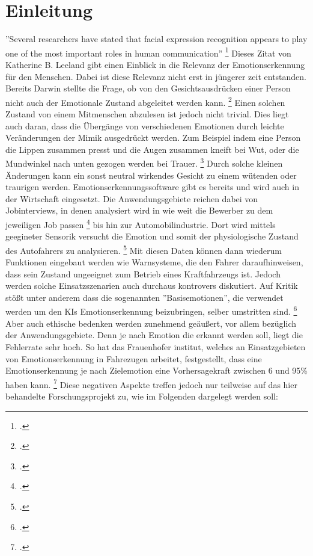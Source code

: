 \documentclass[12pt, a4paper]{scrbook}
\begin{document}
\chapter{Einleitung}
''Several researchers have stated that facial expression recognition appears to play one of the most important roles in human communication'' 
\footcite[Vgl.][1]{FaceRec}
Dieses Zitat von Katherine B. Leeland gibt einen Einblick in die Relevanz der Emotionserkennung für den Menschen. Dabei ist diese Relevanz nicht erst in jüngerer zeit entstanden. Bereits Darwin stellte die Frage, ob von den Gesichtsausdrücken einer Person nicht auch der Emotionale Zustand abgeleitet werden kann.
\footcite[Vgl.][2]{FaceRec}
Einen solchen Zustand von einem Mitmenschen abzulesen ist jedoch nicht trivial. Dies liegt auch daran, dass die Übergänge von verschiedenen Emotionen durch leichte Veränderungen der Mimik ausgedrückt werden. Zum Beispiel indem eine Person die Lippen zusammen presst und die Augen zusammen kneift bei Wut, oder die Mundwinkel nach unten gezogen werden bei Trauer. 
\footcite[Vgl.][249]{HandbookFaceRec}
Durch solche kleinen Änderungen kann ein sonst neutral wirkendes Gesicht zu einem wütenden oder traurigen werden.
Emotionserkennungssoftware gibt es bereits und wird auch in der Wirtschaft eingesetzt. Die Anwendungsgebiete reichen dabei von Jobinterviews, in denen analysiert wird in wie weit die Bewerber zu dem jeweiligen Job passen 
\footcite[Vgl.][]{mixedArticle}
bis hin zur Automobilindustrie. Dort wird mittels geegineter Sensorik versucht die Emotion und somit der physiologische Zustand des Autofahrers zu analysieren.
\footcite[Vgl.][Herausforderung]{Frauenhofer}
Mit diesen Daten können dann wiederum Funktionen eingebaut werden wie Warnsysteme, die den Fahrer daraufhinweisen, dass sein Zustand ungeeignet zum Betrieb eines Kraftfahrzeugs ist. Jedoch werden solche Einsatzszenarien auch durchaus kontrovers diskutiert. Auf Kritik stößt unter anderem dass die sogenannten ''Basisemotionen'', die verwendet werden um den KIs Emotionserkennung beizubringen, selber umstritten sind. 
\footcite[Vgl.][]{SZ}
Aber auch ethische bedenken werden zunehmend geäußert, vor allem bezüglich der Anwendungsgebiete. Denn je nach Emotion die erkannt werden soll, liegt die Fehlerrate sehr hoch. So hat das Frauenhofer institut, welches an Einsatzgebieten von Emotionserkennung in Fahrezugen arbeitet, festgestellt, dass eine Emotionserkennung je nach Zielemotion eine Vorhersagekraft zwischen 6 und 95\% haben kann.
\footcite[Vgl.][Ergebnis]{Frauenhofer}
Diese negativen Aspekte treffen jedoch nur teilweise auf das hier behandelte Forschungsprojekt zu, wie im Folgenden dargelegt werden soll:
\end{document}
